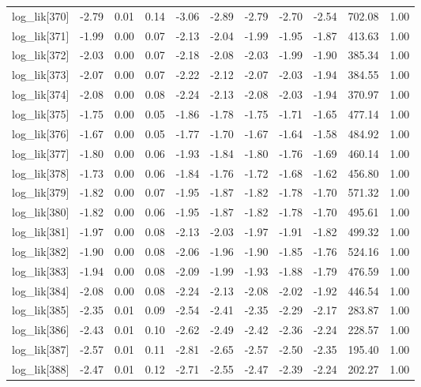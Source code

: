 \begin{table}[ht]
\begin{tabular}{rrrrrrrrrrr}
  log\_lik[370] & -2.79 & 0.01 & 0.14 & -3.06 & -2.89 & -2.79 & -2.70 & -2.54 & 702.08 & 1.00 \\ 
  log\_lik[371] & -1.99 & 0.00 & 0.07 & -2.13 & -2.04 & -1.99 & -1.95 & -1.87 & 413.63 & 1.00 \\ 
  log\_lik[372] & -2.03 & 0.00 & 0.07 & -2.18 & -2.08 & -2.03 & -1.99 & -1.90 & 385.34 & 1.00 \\ 
  log\_lik[373] & -2.07 & 0.00 & 0.07 & -2.22 & -2.12 & -2.07 & -2.03 & -1.94 & 384.55 & 1.00 \\ 
  log\_lik[374] & -2.08 & 0.00 & 0.08 & -2.24 & -2.13 & -2.08 & -2.03 & -1.94 & 370.97 & 1.00 \\ 
  log\_lik[375] & -1.75 & 0.00 & 0.05 & -1.86 & -1.78 & -1.75 & -1.71 & -1.65 & 477.14 & 1.00 \\ 
  log\_lik[376] & -1.67 & 0.00 & 0.05 & -1.77 & -1.70 & -1.67 & -1.64 & -1.58 & 484.92 & 1.00 \\ 
  log\_lik[377] & -1.80 & 0.00 & 0.06 & -1.93 & -1.84 & -1.80 & -1.76 & -1.69 & 460.14 & 1.00 \\ 
  log\_lik[378] & -1.73 & 0.00 & 0.06 & -1.84 & -1.76 & -1.72 & -1.68 & -1.62 & 456.80 & 1.00 \\ 
  log\_lik[379] & -1.82 & 0.00 & 0.07 & -1.95 & -1.87 & -1.82 & -1.78 & -1.70 & 571.32 & 1.00 \\ 
  log\_lik[380] & -1.82 & 0.00 & 0.06 & -1.95 & -1.87 & -1.82 & -1.78 & -1.70 & 495.61 & 1.00 \\ 
  log\_lik[381] & -1.97 & 0.00 & 0.08 & -2.13 & -2.03 & -1.97 & -1.91 & -1.82 & 499.32 & 1.00 \\ 
  log\_lik[382] & -1.90 & 0.00 & 0.08 & -2.06 & -1.96 & -1.90 & -1.85 & -1.76 & 524.16 & 1.00 \\ 
  log\_lik[383] & -1.94 & 0.00 & 0.08 & -2.09 & -1.99 & -1.93 & -1.88 & -1.79 & 476.59 & 1.00 \\ 
  log\_lik[384] & -2.08 & 0.00 & 0.08 & -2.24 & -2.13 & -2.08 & -2.02 & -1.92 & 446.54 & 1.00 \\ 
  log\_lik[385] & -2.35 & 0.01 & 0.09 & -2.54 & -2.41 & -2.35 & -2.29 & -2.17 & 283.87 & 1.00 \\ 
  log\_lik[386] & -2.43 & 0.01 & 0.10 & -2.62 & -2.49 & -2.42 & -2.36 & -2.24 & 228.57 & 1.00 \\ 
  log\_lik[387] & -2.57 & 0.01 & 0.11 & -2.81 & -2.65 & -2.57 & -2.50 & -2.35 & 195.40 & 1.00 \\ 
  log\_lik[388] & -2.47 & 0.01 & 0.12 & -2.71 & -2.55 & -2.47 & -2.39 & -2.24 & 202.27 & 1.00 \\ 

\end{tabular}
\end{table}
